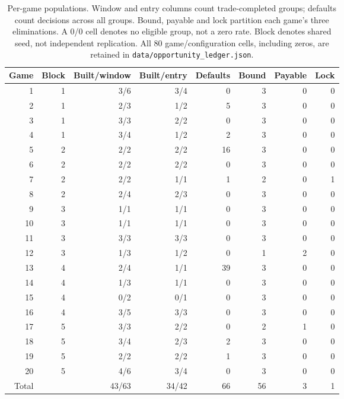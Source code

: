 \begin{table}[htbp]
\centering\small
\begin{tabular}{rrrrrrrr}\toprule
Game & Block & Built/window & Built/entry & Defaults & Bound & Payable & Lock\\\midrule
1 & 1 & 3/6 & 3/4 & 0 & 3 & 0 & 0 \\
2 & 1 & 2/3 & 1/2 & 5 & 3 & 0 & 0 \\
3 & 1 & 3/3 & 2/2 & 0 & 3 & 0 & 0 \\
4 & 1 & 3/4 & 1/2 & 2 & 3 & 0 & 0 \\
5 & 2 & 2/2 & 2/2 & 16 & 3 & 0 & 0 \\
6 & 2 & 2/2 & 2/2 & 0 & 3 & 0 & 0 \\
7 & 2 & 2/2 & 1/1 & 1 & 2 & 0 & 1 \\
8 & 2 & 2/4 & 2/3 & 0 & 3 & 0 & 0 \\
9 & 3 & 1/1 & 1/1 & 0 & 3 & 0 & 0 \\
10 & 3 & 1/1 & 1/1 & 0 & 3 & 0 & 0 \\
11 & 3 & 3/3 & 3/3 & 0 & 3 & 0 & 0 \\
12 & 3 & 1/3 & 1/2 & 0 & 1 & 2 & 0 \\
13 & 4 & 2/4 & 1/1 & 39 & 3 & 0 & 0 \\
14 & 4 & 1/3 & 1/1 & 0 & 3 & 0 & 0 \\
15 & 4 & 0/2 & 0/1 & 0 & 3 & 0 & 0 \\
16 & 4 & 3/5 & 3/3 & 0 & 3 & 0 & 0 \\
17 & 5 & 3/3 & 2/2 & 0 & 2 & 1 & 0 \\
18 & 5 & 3/4 & 2/3 & 2 & 3 & 0 & 0 \\
19 & 5 & 2/2 & 2/2 & 1 & 3 & 0 & 0 \\
20 & 5 & 4/6 & 3/4 & 0 & 3 & 0 & 0 \\
\midrule Total & & 43/63 & 34/42 & 66 & 56 & 3 & 1\\\bottomrule
\end{tabular}
\caption{Per-game populations. Window and entry columns count trade-completed groups; defaults count decisions across all groups. Bound, payable and lock partition each game's three eliminations. A 0/0 cell denotes no eligible group, not a zero rate. Block denotes shared seed, not independent replication. All 80 game/configuration cells, including zeros, are retained in \texttt{data/opportunity\_ledger.json}.}
\label{tab:per-game-audit}
\end{table}
